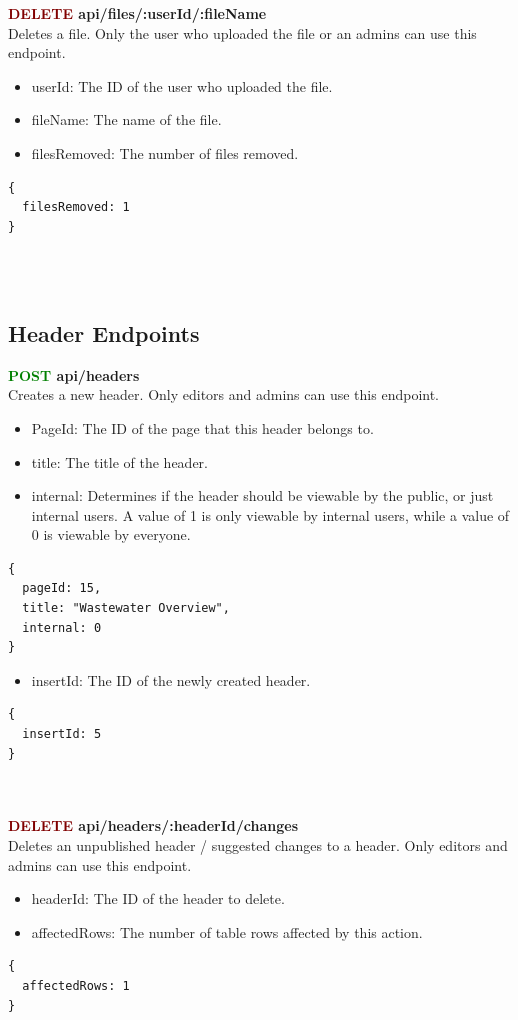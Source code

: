 \documentclass[onecolumn, draftclsnofoot,10pt, compsoc, usenames, dvipsnames]{IEEEtran}
\begin{document}
\noindent
\textbf{\textcolor{Maroon}{DELETE} api/files/:userId/:fileName} \\
Deletes a file. Only the user who uploaded the file or an admins can use this endpoint.
\begin{itemize}
  \item userId: The ID of the user who uploaded the file.
  \item fileName: The name of the file.
  \item filesRemoved: The number of files removed.
\end{itemize}
\begin{lstlisting}[caption=Example Response]
{ 
  filesRemoved: 1
}
\end{lstlisting}
\\~\\


\subsection{Header Endpoints}


\noindent
\textbf{\textcolor{Green}{POST} api/headers} \\
Creates a new header. Only editors and admins can use this endpoint.
\begin{itemize}
    \item PageId: The ID of the page that this header belongs to.
    \item title: The title of the header.
    \item internal: Determines if the header should be viewable by the public, or just internal users. A value of 1 is only viewable by internal users, while a value of 0 is viewable by everyone.
\end{itemize}
\begin{lstlisting}[caption=Example Request Body]
{ 
  pageId: 15,
  title: "Wastewater Overview",
  internal: 0
}
\end{lstlisting}
\begin{itemize}
  \item insertId: The ID of the newly created header.
\end{itemize}
\begin{lstlisting}[caption=Example Response]
{ 
  insertId: 5
}
\end{lstlisting}
\\~\\


\noindent
\textbf{\textcolor{Maroon}{DELETE} api/headers/:headerId/changes} \\
Deletes an unpublished header / suggested changes to a header. Only editors and admins can use this endpoint.
\begin{itemize}
  \item headerId: The ID of the header to delete.
  \item affectedRows: The number of table rows affected by this action.
\end{itemize}
\begin{lstlisting}[caption=Example Response]
{ 
  affectedRows: 1
}
\end{lstlisting}
\\~\\
\end{document}
